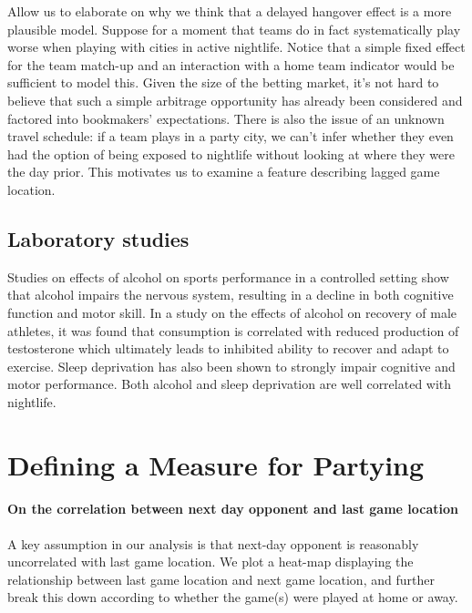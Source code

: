 \documentclass[letterpaper,12pt]{article}
\begin{document}
Allow us to elaborate on why we think that a delayed hangover effect is a more plausible model.
Suppose for a moment that teams do in fact systematically play worse when playing with cities in active nightlife.
Notice that a simple fixed effect for the team match-up and an interaction with a home team indicator would be sufficient to model this.
Given the size of the betting market, it's not hard to believe that such a simple arbitrage opportunity has already been considered
and factored into bookmakers' expectations. There is also the issue of an unknown travel schedule: if a team plays in a party city,
we can't infer whether they even had the option of being exposed to nightlife without looking at where they were the day prior.
This motivates us to examine a feature describing lagged game location.


\subsection{Laboratory studies}
Studies on effects of alcohol on sports performance in a controlled setting
show that alcohol impairs the nervous system, resulting in a decline in both
cognitive function and motor skill.\citep{shirreffs} In a study on 
the effects of alcohol on recovery of male athletes, it was found that
consumption is correlated with reduced production of testosterone
which ultimately leads to inhibited ability to recover and adapt to exercise.\citep{mjbarnes}
Sleep deprivation has also been shown to strongly impair cognitive and motor performance.\citep{pilcher} Both alcohol and sleep deprivation are well correlated with nightlife.


\section{Defining a Measure for Partying}

\paragraph{On the correlation between next day opponent and last game location}
A key assumption in our analysis is that next-day opponent is reasonably uncorrelated with
last game location. We plot a heat-map displaying the relationship between last game location
and next game location, and further break this down according to whether the game(s)
were played at home or away.
\end{document}
